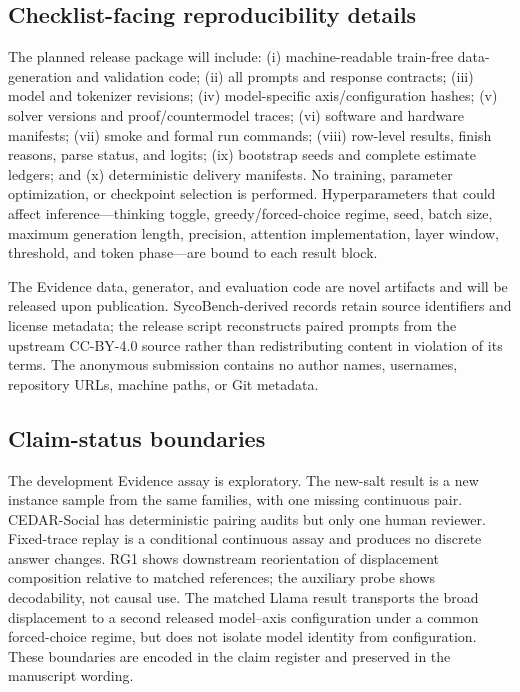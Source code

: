 \documentclass[letterpaper]{article}
\begin{document}
\subsection{Checklist-facing reproducibility details}

The planned release package will include: (i) machine-readable train-free data-generation and validation code; (ii) all prompts and response contracts; (iii) model and tokenizer revisions; (iv) model-specific axis/configuration hashes; (v) solver versions and proof/countermodel traces; (vi) software and hardware manifests; (vii) smoke and formal run commands; (viii) row-level results, finish reasons, parse status, and logits; (ix) bootstrap seeds and complete estimate ledgers; and (x) deterministic delivery manifests.  No training, parameter optimization, or checkpoint selection is performed.  Hyperparameters that could affect inference---thinking toggle, greedy/forced-choice regime, seed, batch size, maximum generation length, precision, attention implementation, layer window, threshold, and token phase---are bound to each result block.

The Evidence data, generator, and evaluation code are novel artifacts and will be released upon publication.  SycoBench-derived records retain source identifiers and license metadata; the release script reconstructs paired prompts from the upstream CC-BY-4.0 source rather than redistributing content in violation of its terms.  The anonymous submission contains no author names, usernames, repository URLs, machine paths, or Git metadata.

\subsection{Claim-status boundaries}

The development Evidence assay is exploratory.  The new-salt result is a new instance sample from the same families, with one missing continuous pair.  CEDAR-Social has deterministic pairing audits but only one human reviewer.  Fixed-trace replay is a conditional continuous assay and produces no discrete answer changes.  RG1 shows downstream reorientation of displacement composition relative to matched references; the auxiliary probe shows decodability, not causal use.  The matched Llama result transports the broad displacement to a second released model--axis configuration under a common forced-choice regime, but does not isolate model identity from configuration.  These boundaries are encoded in the claim register and preserved in the manuscript wording.


\end{document}
